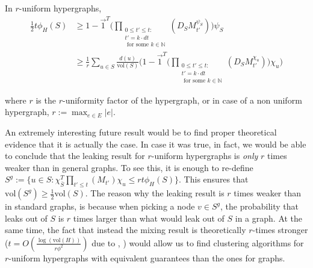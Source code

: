 \documentclass[../main.tex]{subfiles}
\begin{document}
    \begin{conj}
    	In $r$-uniform hypergraphs,
	    \begin{align}
	        \frac{1}{2} t\phi_H(S) & \geq
	        1 - \vec{1}^T\bigg(\prod_{\substack{0 \leq t'\leq t:\\ t' = k\cdot dt\\ \text{ for some }k\in \mathbb{N}}}(D_S M_{t'}^{\psi_S})\bigg) \psi_S \\
	        & \geq \frac{1}{r} \sum_{u\in S} \frac{d(u)}{\text{vol}(S)}\bigg(1 - \vec{1}^T\bigg(\prod_{\substack{0 \leq t'\leq t:\\ t' = k\cdot dt\\ \text{ for some }k\in \mathbb{N}}}(D_S M_{t'}^{\chi_u})\bigg)\chi_u\bigg)
	    \end{align}
	\end{conj}
    
    where $r$ is the $r$-uniformity factor of the hypergraph, or in case of a non uniform hypergraph, $r := \max_{e\in E}|e|$. 
    
    An extremely interesting future result would be to find proper theoretical evidence that it is actually the case. In case it was true, in fact, we would be able to conclude that the leaking result for $r$-uniform hypergraphs is \textit{only} $r$ times weaker than in general graphs. To see this, it is enough to re-define $S^g:=\{u\in S: \chi_{\bar{S}}^T \prod_{t'\leq t}(M_{t'}) \chi_u \leq r t \phi_H(S)\}$. This ensures that $\text{vol}(S^g) \geq \frac{1}{2}\text{vol}(S)$. The reason why the leaking result is $r$ times weaker than in standard graphs, is because when picking a node $v\in S^g$, the probability that leaks out of $S$ is $r$ times larger than what would leak out of $S$ in a graph. At the same time, the fact that instead the mixing result is theoretically $r$-times stronger ($t = O(\frac{\log(\text{vol}(H))}{r\phi^2})$ due to  \cite{continuous_laplacian_hypergraph}, \cite{Kapralov2020Nov}) would allow us to find clustering algorithms for $r$-uniform hypergraphs with equivalent guarantees than the ones for graphs. 
    
\end{document}
